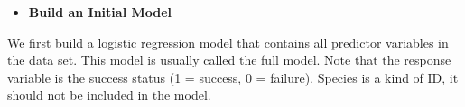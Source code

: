 \documentclass[
]{book}
\newenvironment{Shaded}{\begin{snugshade}}{\end{snugshade}}
\newcommand{\AttributeTok}[1]{\textcolor[rgb]{0.13,0.29,0.53}{#1}}
\newcommand{\FunctionTok}[1]{\textcolor[rgb]{0.13,0.29,0.53}{\textbf{#1}}}
\newcommand{\NormalTok}[1]{#1}
\newcommand{\OtherTok}[1]{\textcolor[rgb]{0.56,0.35,0.01}{#1}}
\newcommand{\SpecialCharTok}[1]{\textcolor[rgb]{0.81,0.36,0.00}{\textbf{#1}}}
\newcommand{\StringTok}[1]{\textcolor[rgb]{0.31,0.60,0.02}{#1}}
\providecommand{\tightlist}{%
  \setlength{\itemsep}{0pt}\setlength{\parskip}{0pt}}
\begin{document}
\begin{itemize}
\tightlist
\item
  \textbf{Build an Initial Model}
\end{itemize}

We first build a logistic regression model that contains all predictor variables in the data set. This model is usually called the full model. Note that the response variable is the success status (1 = success, 0 = failure). Species is a kind of ID, it should not be included in the model.

\begin{Shaded}
\end{Shaded}
\end{document}
